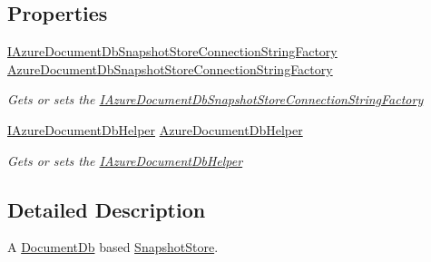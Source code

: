 \subsection*{Properties}
\begin{DoxyCompactItemize}
\item 
\hyperlink{interfaceCqrs_1_1Azure_1_1DocumentDb_1_1Events_1_1IAzureDocumentDbSnapshotStoreConnectionStringFactory}{I\+Azure\+Document\+Db\+Snapshot\+Store\+Connection\+String\+Factory} \hyperlink{classCqrs_1_1Azure_1_1DocumentDb_1_1Events_1_1AzureDocumentDbSnapshotStore_abd183070e1a0240ced368408960c9158_abd183070e1a0240ced368408960c9158}{Azure\+Document\+Db\+Snapshot\+Store\+Connection\+String\+Factory}
\begin{DoxyCompactList}\small\item\em Gets or sets the \hyperlink{interfaceCqrs_1_1Azure_1_1DocumentDb_1_1Events_1_1IAzureDocumentDbSnapshotStoreConnectionStringFactory}{I\+Azure\+Document\+Db\+Snapshot\+Store\+Connection\+String\+Factory} \end{DoxyCompactList}\item 
\hyperlink{interfaceCqrs_1_1Azure_1_1DocumentDb_1_1IAzureDocumentDbHelper}{I\+Azure\+Document\+Db\+Helper} \hyperlink{classCqrs_1_1Azure_1_1DocumentDb_1_1Events_1_1AzureDocumentDbSnapshotStore_ae34fa8dad15d4c7d1dffac129aea9c10_ae34fa8dad15d4c7d1dffac129aea9c10}{Azure\+Document\+Db\+Helper}
\begin{DoxyCompactList}\small\item\em Gets or sets the \hyperlink{interfaceCqrs_1_1Azure_1_1DocumentDb_1_1IAzureDocumentDbHelper}{I\+Azure\+Document\+Db\+Helper} \end{DoxyCompactList}\end{DoxyCompactItemize}


\subsection{Detailed Description}
A \hyperlink{namespaceCqrs_1_1Azure_1_1DocumentDb}{Document\+Db} based \hyperlink{classCqrs_1_1Snapshots_1_1SnapshotStore_aa8ab186f864443c7d9647a4522864a84_aa8ab186f864443c7d9647a4522864a84}{Snapshot\+Store}. 



